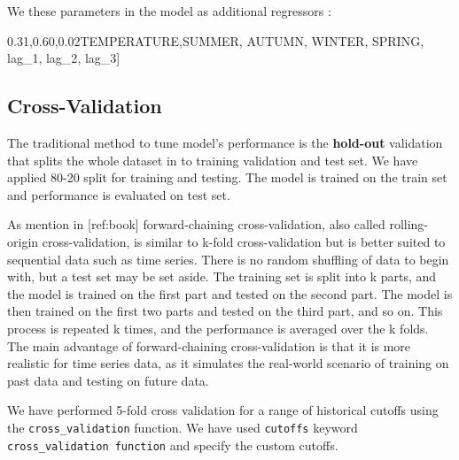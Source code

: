 \documentclass[mstat,12pt]{unswthesis}
\newenvironment{Shaded}{\begin{snugshade}}{\end{snugshade}}
\newcommand{\NormalTok}[1]{#1}
\newcommand{\StringTok}[1]{\textcolor[rgb]{0.31,0.60,0.02}{#1}}
\begin{document}
We these parameters in the model as additional regressors :

\begin{Shaded}
\begin{Highlighting}[]
\NormalTok{[}\StringTok{\textquotesingle{}TEMPERATURE\textquotesingle{}}\NormalTok{,}\StringTok{\textquotesingle{}SUMMER\textquotesingle{}}\NormalTok{, }\StringTok{\textquotesingle{}AUTUMN\textquotesingle{}}\NormalTok{, }\StringTok{\textquotesingle{}WINTER\textquotesingle{}}\NormalTok{, }\StringTok{\textquotesingle{}SPRING\textquotesingle{}}\NormalTok{, }
        \StringTok{\textquotesingle{}lag\_1\textquotesingle{}}\NormalTok{, }\StringTok{\textquotesingle{}lag\_2\textquotesingle{}}\NormalTok{, }\StringTok{\textquotesingle{}lag\_3\textquotesingle{}}\NormalTok{]}
\end{Highlighting}
\end{Shaded}

\subsection{Cross-Validation}\label{cross-validation}

The traditional method to tune model's performance is the
\textbf{hold-out} validation that splits the whole dataset in to
training validation and test set. We have applied 80-20 split for
training and testing. The model is trained on the train set and
performance is evaluated on test set.

As mention in {[}ref:book{]} forward-chaining cross-validation, also
called rolling-origin cross-validation, is similar to k-fold
cross-validation but is better suited to sequential data such as time
series. There is no random shuffling of data to begin with, but a test
set may be set aside. The training set is split into k parts, and the
model is trained on the first part and tested on the second part. The
model is then trained on the first two parts and tested on the third
part, and so on. This process is repeated k times, and the performance
is averaged over the k folds. The main advantage of forward-chaining
cross-validation is that it is more realistic for time series data, as
it simulates the real-world scenario of training on past data and
testing on future data.

We have performed 5-fold cross validation for a range of historical
cutoffs using the \texttt{cross\_validation} function. We have used
\texttt{cutoffs} keyword \texttt{cross\_validation\ function} and
specify the custom cutoffs.
\end{document}
